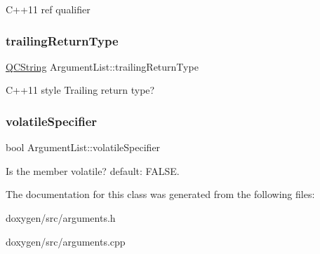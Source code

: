 C++11 ref qualifier \mbox{\label{class_argument_list_ac41ea581a7578480e4bed0d6c5e1af78}} 
\subsubsection{\texorpdfstring{trailingReturnType}{trailingReturnType}}
{\footnotesize\ttfamily \mbox{\hyperlink{class_q_c_string}{Q\+C\+String}} Argument\+List\+::trailing\+Return\+Type}

C++11 style Trailing return type? \mbox{\label{class_argument_list_ae058c8cda0c6ce8837aab723e0af62bd}} 
\subsubsection{\texorpdfstring{volatileSpecifier}{volatileSpecifier}}
{\footnotesize\ttfamily bool Argument\+List\+::volatile\+Specifier}

Is the member volatile? default\+: F\+A\+L\+SE. 

The documentation for this class was generated from the following files\+:\begin{DoxyCompactItemize}
\item 
doxygen/src/arguments.\+h\item 
doxygen/src/arguments.\+cpp\end{DoxyCompactItemize}
